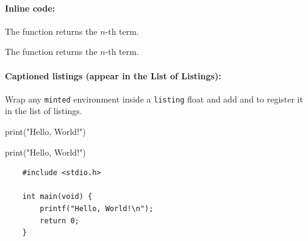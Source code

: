 \paragraph{Inline code:}
\begin{latexcode}
The function  returns the $n$-th term.
\end{latexcode}
The function  returns the $n$-th term.

\paragraph{Captioned listings (appear in the List of Listings):}

Wrap any \texttt{minted} environment inside a \texttt{listing} float and add
\latexinline{\caption} and \latexinline{\label} to register it in the list of listings.
\begin{latexcode}
\begin{listing}[htbp]
  \caption{Hello, World! in Python.}
  \label{lst:hello-python}
  \begin{pythoncode}
    print("Hello, World!")
  \end{pythoncode}
\end{listing}
\end{latexcode}

\begin{listing}[htbp]
  \caption{\emph{Hello, World!} in Python.}
  \label{lst:hello-python}
  \begin{pythoncode}
    print("Hello, World!")
  \end{pythoncode}
\end{listing}

\begin{listing}[htbp]
  \caption{\emph{Hello, World!} in C.}
  \label{lst:hello-c}
  \begin{verbatim}
    #include <stdio.h>

    int main(void) {
        printf("Hello, World!\n");
        return 0;
    }
  \end{verbatim}
\end{listing}

\begin{listing}[htbp]
  \caption{\emph{Hello, World!} in \LaTeX{}.}
  \label{lst:hello-latex}
\end{listing}

